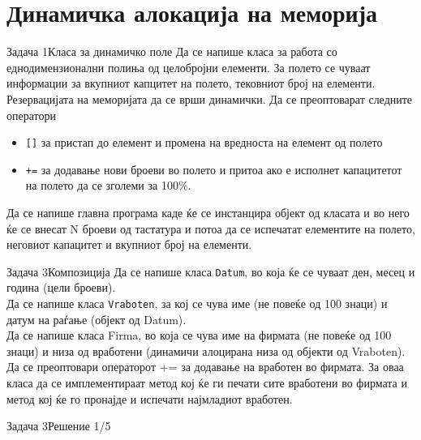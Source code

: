 \section{Динамичка алокација на меморија}

\begin{frame}{Задача 1}{Класа за динамичко поле}
Да се напише класа за работа со еднодимензионални полиња од целобројни елементи.
За полето се чуваат информации за вкупниот капцитет на полето, тековниот број на
елементи. Резервацијата на меморијата да се врши динамички. 
Да се преоптоварат следните оператори 
\begin{itemize}
  \item \texttt{[]} за пристап до елемент и промена на вредноста на
  елемент од полето
  \item \texttt{+=} за додавање нови броеви во полето и притоа ако е исполнет
  капацитетот на полето да се зголеми за 100\%.
\end{itemize}
Да се напише главна програма каде ќе се инстанцира објект од класата и во него
ќе се внесат N броеви од тастатура и потоа да се испечатат елементите на полето,
неговиот капацитет и вкупниот број на елементи.
\end{frame}


\begin{frame}{Задача 3}{Композиција}
Да се напише класа \texttt{Datum}, во која ќе се чуваат ден, месец и година (цели
броеви).\\
Да се напише класа \texttt{Vraboten}, за кој се чува име (не повеќе од 100
знаци) и датум на раѓање (објект од Datum).\\ 
Да се напише класа Firma, во која се чува име на фирмата (не повеќе од 100
знаци) и низа од вработени (динамичи алоцирана низа од објекти од Vraboten).
Да се преоптовари операторот += за додавање на вработен во фирмата.
За оваа класа да се имплементираат метод кој ќе ги печати
сите вработени во фирмата и метод кој ќе го пронајде и испечати најмладиот вработен.
\end{frame}

\begin{frame}[fragile]{Задача 3}{Решение 1/5}
%
\end{frame}

